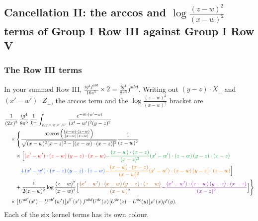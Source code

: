 \documentclass[9pt]{article}
\newcommand{\R}[1]{{\color{cR}#1}}
\newcommand{\B}[1]{{\color{cB}#1}}
\newcommand{\G}[1]{{\color{cG}#1}}
\newcommand{\Or}[1]{{\color{cO}#1}}
\newcommand{\Vi}[1]{{\color{cV}#1}}
\newcommand{\Br}[1]{{\color{cN}#1}}
\numberwithin{equation}{section}
\begin{document}
\subsection{Cancellation II: the arccos and $\log\frac{(z-w)^{2}}{(x-w)^{2}}$ terms of Group I Row III against Group I Row V}
\subsubsection*{The Row III terms}
In your summed Row III, $\frac{ig^{4}f^{abd}}{16\pi^{5}}\times2=\frac{ig^{4}}{8\pi^{5}}f^{abd}$. Writing out $(y-z)\cdot X_{\perp}$ and $(x'-w')\cdot Z_{\perp}$, the arccos term and the $\log\frac{(z-w)^{2}}{(x-w)^{2}}$ bracket are
\begin{align}
&\frac{1}{(2\pi)^{3}}\,\frac{ig^{4}}{8\pi^{5}}\,\frac{1}{k^{+}}\int_{x,y,z,w,x',w'}\frac{e^{-ik\cdot(w'-w)}}{(x'-w')^{2}(y-z)^{2}}\notag\\
&\quad\times\Bigg\{\frac{\arccos\Big(\frac{(x-w)\cdot(z-w)}{|x-w|\,|z-w|}\Big)}{\sqrt{(x-w)^{2}(x-z)^{2}-[(x-w)\cdot(x-z)]^{2}}}\frac{1}{(z-w)^{2}}\notag\\
&\qquad\times\Big[\R{(x'-w')\cdot(z-w)\,(y-z)\cdot(x-w)}\G{-\frac{(x-w)\cdot(x-z)}{(x-z)^{2}}(x'-w')\cdot(z-w)\,(y-z)\cdot(x-z)}\notag\\
&\qquad\quad\B{+(x'-w')\cdot(x-z)\,(y-z)\cdot(z-w)}\Or{-\frac{(x-w)\cdot(x-z)}{(x-w)^{2}}(x'-w')\cdot(x-w)\,(y-z)\cdot(z-w)}\Big]\notag\\
&\qquad+\frac{1}{2(z-w)^{2}}\log\frac{(z-w)^{2}}{(x-w)^{2}}\Big[\Br{\frac{(x'-w')\cdot(x-w)\,(y-z)\cdot(z-w)}{(x-w)^{2}}}\Vi{-\frac{(x'-w')\cdot(z-w)\,(y-z)\cdot(x-z)}{(x-z)^{2}}}\Big]\Bigg\}\notag\\
&\quad\times\big[U^{ab'}(x')-U^{ab'}(w')\big]\rho^{b'}(x')\,f^{abd}U^{de}(x)\big[U^{bc}(z)-U^{bc}(y)\big]\rho^{e}(x)\rho^{c}(y).\label{eq:R3six}
\end{align}
Each of the six kernel terms has its own colour.
\end{document}
